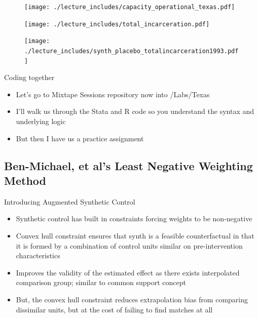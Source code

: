 \documentclass{beamer}
\begin{document}
\begin{frame}[shrink=30,plain]
\begin{figure}
\texttt{[image: ./lecture\_includes/capacity\_operational\_texas.pdf]}
\end{figure}
\end{frame}



\begin{frame}[shrink=30,plain]

\begin{figure}
\texttt{[image: ./lecture\_includes/total\_incarceration.pdf]}
\end{figure}
\end{frame}

\begin{frame}[shrink=30,plain]

\begin{figure}
\texttt{[image: ./lecture\_includes/synth\_placebo\_totalincarceration1993.pdf]}
\end{figure}
\end{frame}





\begin{frame}{Coding together}

\begin{itemize}
\item Let's go to Mixtape Sessions repository now into /Labs/Texas 
\item I'll walk us through the Stata and R code so you understand the syntax and underlying logic
\item But then I have us a practice assignment 
\end{itemize}

\end{frame}



\subsection{Ben-Michael, et al's Least Negative Weighting Method}

\begin{frame}{Introducing Augmented Synthetic Control}
\begin{itemize}
\item Synthetic control has built in constraints forcing weights to be non-negative
\item Convex hull constraint ensures that synth is a feasible counterfactual in that it is formed by a combination of control units similar on pre-intervention characteristics
\item Improves the validity of the estimated effect as there exists interpolated comparison group; similar to common support concept
\item But, the convex hull constraint reduces extrapolation bias from comparing dissimilar units, but at the cost of failing to find matches at all
\end{itemize}

\end{frame}
\end{document}
